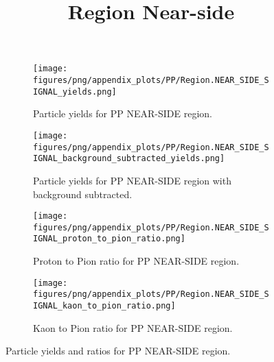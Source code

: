                 \begin{figure}[H]
                    \title{Region Near-side}
                    \begin{subfigure}[b]{0.5\textwidth}
                        \centering
                        \texttt{[image: figures/png/appendix\_plots/PP/Region.NEAR\_SIDE\_SIGNAL\_yields.png]}
                        \caption{Particle yields for PP NEAR-SIDE region.}
                        \label{fig:appendix_PP_NEAR_SIDE_SIGNAL_Inclusive_Yields}
                    \end{subfigure}
                    \begin{subfigure}[b]{0.5\textwidth}
                        \centering
                        \texttt{[image: figures/png/appendix\_plots/PP/Region.NEAR\_SIDE\_SIGNAL\_background\_subtracted\_yields.png]}
                        \caption{Particle yields for PP NEAR-SIDE region with background subtracted.}
                        \label{fig:appendix_PP_NEAR_SIDE_SIGNAL_Inclusive_Yields_Background_Subtracted}
                    \end{subfigure}
                    \begin{subfigure}[b]{0.5\textwidth}
                        \centering
                        \texttt{[image: figures/png/appendix\_plots/PP/Region.NEAR\_SIDE\_SIGNAL\_proton\_to\_pion\_ratio.png]}
                        \caption{Proton to Pion ratio for PP NEAR-SIDE region.}
                        \label{fig:appendix_PP_NEAR_SIDE_SIGNAL_Proton_to_Pion_Ratio}
                    \end{subfigure}
                    \begin{subfigure}[b]{0.5\textwidth}
                        \centering
                        \texttt{[image: figures/png/appendix\_plots/PP/Region.NEAR\_SIDE\_SIGNAL\_kaon\_to\_pion\_ratio.png]}
                        \caption{Kaon to Pion ratio for PP NEAR-SIDE region.}
                        \label{fig:appendix_PP_NEAR_SIDE_SIGNAL_Kaon_to_Pion_Ratio}
                    \end{subfigure}
                    \caption{Particle yields and ratios for PP NEAR-SIDE region.}
                    \label{fig:appendix_PP_NEAR_SIDE_SIGNAL_Inclusive_Yields_and_Ratios}
                \end{figure}
